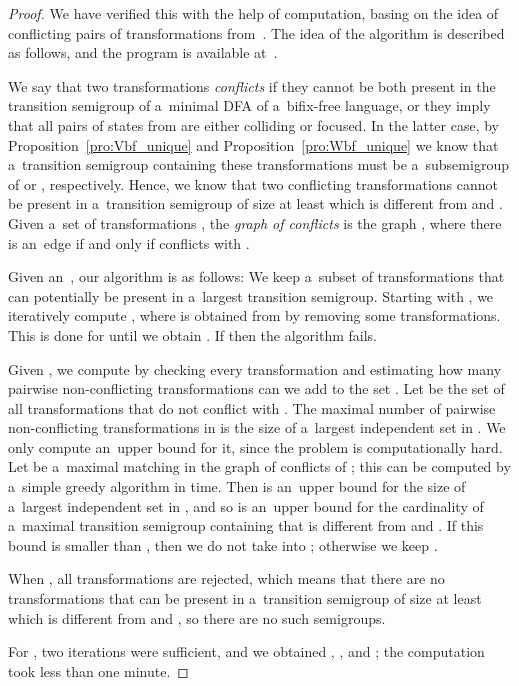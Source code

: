 \documentclass{amsart}
\begin{document}
\begin{proof}
We have verified this with the help of computation, basing on the idea of conflicting pairs of transformations from~\cite[Theorem~20]{BLY12}.
The idea of the algorithm is described as follows, and the program is available at~\cite{SzWi18SyntacticComplexityOfBifixFreeArxiv}.

We say that two transformations  \emph{conflicts} if they cannot be both present in the transition semigroup of a~minimal DFA  of a~bifix-free language, or they imply that all pairs of states from  are either colliding or focused.
In the latter case, by Proposition~\ref{pro:Vbf_unique} and Proposition~\ref{pro:Wbf_unique} we know that a~transition semigroup containing these transformations must be a~subsemigroup of  or , respectively.
Hence, we know that two conflicting transformations cannot be present in a~transition semigroup of size at least  which is different from  and .
Given a~set of transformations , the \emph{graph of conflicts} is the graph , where there is an~edge  if and only if  conflicts with .

Given an~, our algorithm is as follows:
We keep a~subset  of transformations that can potentially be present in a~largest transition semigroup.
Starting with , we iteratively compute , where  is obtained from  by removing some transformations.
This is done for  until we obtain .
If  then the algorithm fails.

Given , we compute  by checking every transformation  and estimating how many pairwise non-conflicting transformations can we add to the set .
Let  be the set of all transformations that do not conflict with .
The maximal number of pairwise non-conflicting transformations in  is the size of a~largest independent set in .
We only compute an~upper bound for it, since the problem is computationally hard.
Let  be a~maximal matching in the graph of conflicts of ; this can be computed by a~simple greedy algorithm in  time.
Then  is an~upper bound for the size of a~largest independent set in , and so  is an~upper bound for the cardinality of a~maximal transition semigroup containing  that is different from  and .
If this bound is smaller than , then we do not take  into ; otherwise we keep .

When , all transformations are rejected, which means that there are no transformations that can be present in a~transition semigroup of size at least  which is different from  and , so there are no such semigroups.

For , two iterations were sufficient, and we obtained , , and ; the computation took less than one minute.
\end{proof}
\end{document}
